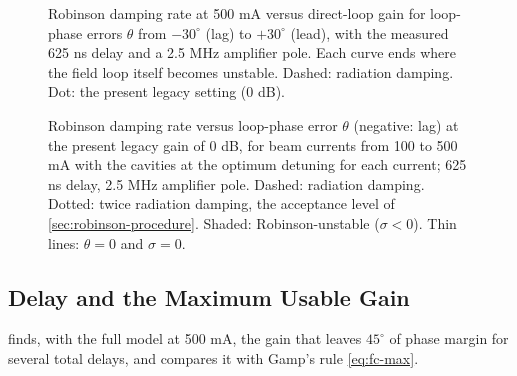 \begin{figure}[tbp]
\centering
\begin{fitpicture}\end{fitpicture}
\caption[Robinson damping versus loop gain and phase]{Robinson damping rate at 500 mA versus direct-loop gain for loop-phase errors \(\theta\) from \(-30^\circ\) (lag) to \(+30^\circ\) (lead), with the measured 625 ns delay and a 2.5 MHz amplifier pole. Each curve ends where the field loop itself becomes unstable. Dashed: radiation damping. Dot: the present legacy setting (0 dB).}\label{fig:robinson-gain}
\end{figure}

\begin{figure}[tbp]
\centering
\begin{fitpicture}\end{fitpicture}
\caption[Robinson damping versus loop phase at 0 dB]{Robinson damping rate versus loop-phase error \(\theta\) (negative: lag) at the present legacy gain of 0 dB, for beam currents from 100 to 500 mA with the cavities at the optimum detuning for each current; 625 ns delay, 2.5 MHz amplifier pole. Dashed: radiation damping. Dotted: twice radiation damping, the acceptance level of \cref{sec:robinson-procedure}. Shaded: Robinson-unstable (\(\sigma < 0\)). Thin lines: \(\theta = 0\) and \(\sigma = 0\).}\label{fig:robinson-phase}
\end{figure}

\subsection{Delay and the Maximum Usable Gain}\label{sec:robinson-delay}

 finds, with the full model at 500 mA, the gain that leaves \(45^\circ\) of phase margin for several total delays, and compares it with Gamp's rule \eqref{eq:fc-max}.

